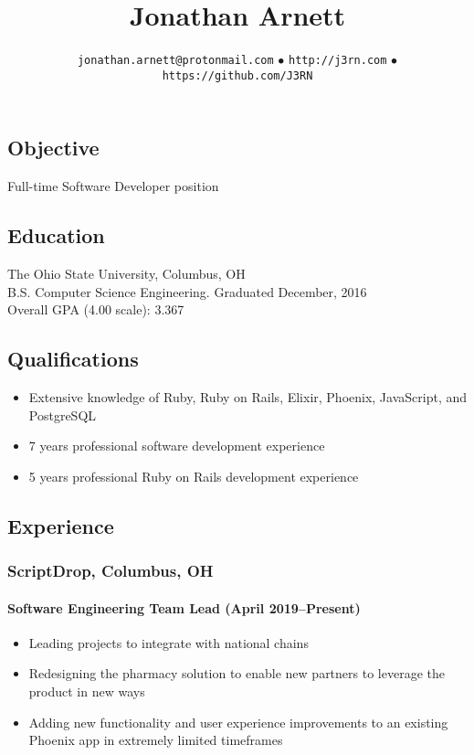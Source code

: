 \documentclass[]{article}
\begin{document}
\title{Jonathan Arnett}
\author{\texttt{jonathan.arnett@protonmail.com} $\bullet$ \texttt{http://j3rn.com} $\bullet$ \texttt{https://github.com/J3RN}}
\date{}
\maketitle

\subsection*{Objective}
Full-time Software Developer position

\subsection*{Education}
The Ohio State University, Columbus, OH \\
B.S. Computer Science Engineering. Graduated December, 2016 \\
Overall GPA (4.00 scale): 3.367

\subsection*{Qualifications}
\begin{itemize}
\item Extensive knowledge of Ruby, Ruby on Rails, Elixir, Phoenix, JavaScript, and PostgreSQL
\item 7 years professional software development experience
\item 5 years professional Ruby on Rails development experience
\end{itemize}

\subsection*{Experience}

\subsubsection*{ScriptDrop, Columbus, OH}
\paragraph{Software Engineering Team Lead (April 2019--Present)}
\begin{itemize}
\item Leading projects to integrate with national chains
\item Redesigning the pharmacy solution to enable new partners to leverage the product in new ways
\item Adding new functionality and user experience improvements to an existing Phoenix app in extremely limited timeframes
\end{itemize}
\end{document}
